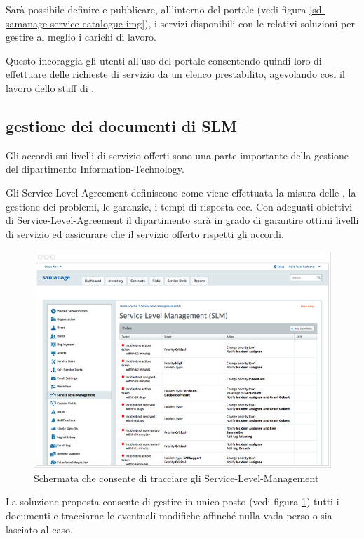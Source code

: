Sarà possibile definire e pubblicare, all'interno del portale (vedi figura \ref{sd-samanage-service-catalogue-img}), i servizi disponibili con le relativi soluzioni per gestire al meglio i carichi di lavoro.

Questo incoraggia gli utenti all'uso del portale  consentendo quindi loro di effettuare delle richieste di servizio da un elenco prestabilito, agevolando cosi il lavoro dello staff di .

\subsection[Gestione dei documenti di SLM]{gestione dei documenti di SLM}
\label{sd-sla-management}
Gli accordi sui livelli di servizio offerti sono una parte importante della gestione del dipartimento \acs{Information-Technology}.

Gli \ac{Service-Level-Agreement} definiscono come viene effettuata la misura delle , la gestione dei problemi, le garanzie, i tempi di risposta ecc. Con adeguati obiettivi di \ac{Service-Level-Agreement} il dipartimento sarà in grado di garantire ottimi livelli di servizio ed assicurare che il servizio offerto rispetti gli accordi.

\begin{figure}[htbp]
\centering
\includegraphics[scale=0.6]{Images/samanage/Service_level_management.png}
\caption{Schermata che consente di tracciare gli \ac{Service-Level-Management}}
\label{sd-samanage-service-level-management-img}
\end{figure}

La soluzione proposta consente di gestire in unico posto (vedi figura \ref{sd-samanage-service-level-management-img}) tutti i documenti e tracciarne le eventuali modifiche affinché nulla vada perso o sia lasciato al caso.